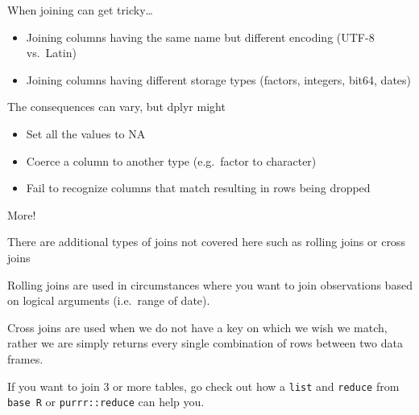 \documentclass[ignorenonframetext,]{beamer}
\providecommand{\tightlist}{%
  \setlength{\itemsep}{0pt}\setlength{\parskip}{0pt}}
\begin{document}
\begin{frame}{When joining can get tricky\ldots{}}

\begin{itemize}
\tightlist
\item
  Joining columns having the same name but different encoding (UTF-8
  vs.~Latin)
\item
  Joining columns having different storage types (factors, integers,
  bit64, dates)
\end{itemize}

The consequences can vary, but dplyr might

\begin{itemize}
\tightlist
\item
  Set all the values to NA
\item
  Coerce a column to another type (e.g.~factor to character)
\item
  Fail to recognize columns that match resulting in rows being dropped
\end{itemize}

\end{frame}

\begin{frame}[fragile]{More!}

There are additional types of joins not covered here such as rolling
joins or cross joins

Rolling joins are used in circumstances where you want to join
observations based on logical arguments (i.e.~range of date).

Cross joins are used when we do not have a key on which we wish we
match, rather we are simply returns every single combination of rows
between two data frames.

If you want to join 3 or more tables, go check out how a \texttt{list}
and \texttt{reduce} from \texttt{base\ R} or \texttt{purrr::reduce} can
help you.

\end{frame}
\end{document}

